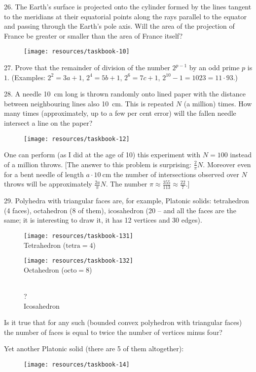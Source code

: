 \begin{problem}{26.}
The Earth's surface is projected onto the cylinder formed by the lines tangent to the meridians
at their equatorial points along the rays parallel to the equator and passing through the Earth's pole axis.
Will the area of the projection of France be greater or smaller than the area of France itself?
\begin{figure}
	\texttt{[image: resources/taskbook-10]}
\end{figure}
\end{problem}

\begin{problem}{27.}
Prove that the remainder of division of the number $2^{p-1}$ by an odd prime $p$ is $1$.
(Examples: $2^2 = 3a + 1$, $2^4 = 5b+1$, $2^6 = 7c+1$, $2^{10} - 1 = 1023 = 11\cdot 93$.)
\end{problem}

\begin{problem}{28.}
A needle \SI{10}{\cm} long is thrown randomly onto lined paper with the distance between neighbouring
lines also \SI{10}{\cm}. This is repeated
$N$ (a million) times.
How many times (approximately, up to a few per
cent error) will the fallen needle intersect a line on the paper?
\begin{figure}
	\texttt{[image: resources/taskbook-12]}
\end{figure}
One can perform (as I did at the age of 10) this experiment with $N=100$ instead of a million throws.
	[The answer to this problem is surprising: $\frac2{\pi}N$. Moreover even for a bent needle of length $a \cdot \SI{10}{\cm}$ the number of intersections observed over $N$ throws will be approximately $\frac{2a}{\pi}N$.
		The number $\pi \approx  \frac{355}{113} \approx \frac{22}7.$]
\end{problem}

\begin{problem}{29.}
Polyhedra with triangular faces are, for example, Platonic solids: tetrahedron (4 faces),
octahedron (8 of them), icosahedron (20 -- and all the faces are the same; it is interesting to draw it,
it has 12 vertices and 30 edges).
\begin{figure}
	\footnotesize
	\null\hfill
	\parbox{0.3\linewidth}{\centering\texttt{[image: resources/taskbook-131]}\\Tetrahedron ($\text{tetra}= 4$)}
	\hfill
	\parbox{0.3\linewidth}{\centering\texttt{[image: resources/taskbook-132]}\\Octahedron ($\text{octo}= 8$)}
	\hfill\null\\
	{\Huge ?}\\Icosahedron
\end{figure}
Is it true that for any such (bounded convex polyhedron with triangular faces) the number of faces is
equal to twice the number of vertices minus four?


Yet another Platonic solid (there are 5 of them altogether):
\begin{figure}
	\texttt{[image: resources/taskbook-14]}
\end{figure}
\end{problem}

